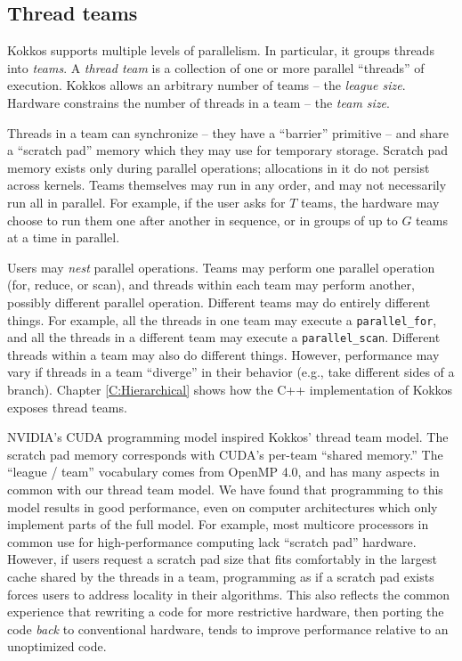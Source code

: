 \subsection{Thread teams}\label{S:Model:Teams}

Kokkos supports multiple levels of parallelism.
In particular, it groups threads into \emph{teams}.
A \emph{thread team} is a collection of one or more parallel ``threads'' of execution.
Kokkos allows an arbitrary number of teams -- the \emph{league size}.
Hardware constrains the number of threads in a team -- the \emph{team size}.

Threads in a team can synchronize -- they have a ``barrier'' primitive -- 
and share a ``scratch pad'' memory which they may use for temporary storage.
Scratch pad memory exists only during parallel operations;
allocations in it do not persist across kernels.
Teams themselves may run in any order,
and may not necessarily run all in parallel.
For example, if the user asks for $T$ teams,
the hardware may choose to run them one after another in sequence,
or in groups of up to $G$ teams at a time in parallel.

Users may \emph{nest} parallel operations.
Teams may perform one parallel operation (for, reduce, or scan),
and threads within each team may perform another, possibly different parallel operation.
Different teams may do entirely different things.
For example, all the threads in one team may execute a \lstinline!parallel_for!,
and all the threads in a different team may execute a \lstinline!parallel_scan!.
Different threads within a team may also do different things.
However, performance may vary if threads in a team ``diverge'' in their behavior
(e.g., take different sides of a branch).
Chapter \ref{C:Hierarchical} shows how the C++ implementation of Kokkos exposes thread teams.

NVIDIA's CUDA programming model inspired Kokkos' thread team model.
The scratch pad memory corresponds with CUDA's per-team ``shared memory.''
The ``league / team'' vocabulary comes from OpenMP 4.0,
and has many aspects in common with our thread team model.
We have found that programming to this model results in good performance,
even on computer architectures which only implement parts of the full model.
For example, most multicore processors in common use for high-performance computing lack ``scratch pad'' hardware.
However, if users request a scratch pad size that fits comfortably in the largest cache shared by the threads in a team,
programming as if a scratch pad exists forces users to address locality in their algorithms.
This also reflects the common experience that rewriting a code for more restrictive hardware,
then porting the code \emph{back} to conventional hardware,
tends to improve performance relative to an unoptimized code.

